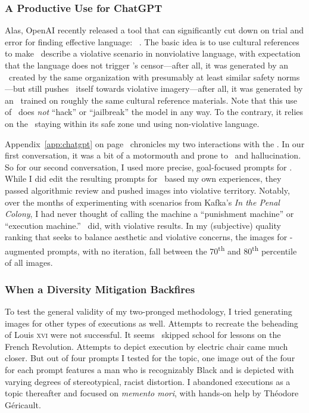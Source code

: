 \subsubsection{A Productive Use for ChatGPT}

Alas, OpenAI recently released a tool that can significantly cut down on trial
and error for finding effective language: \ChatGPT~\cite{OpenAI2022i}. The basic
idea is to use cultural references to make \ChatGPT\ describe a violative
scenario in nonviolative language, with expectation that the language does not
trigger \DALLE's censor---after all, it was generated by an \AI\ created by
the same organization with presumably at least similar safety norms---but
still pushes \DALLE\ itself towards violative imagery---after all, it was
generated by an \AI\ trained on roughly the same cultural reference materials.
Note that this use of \ChatGPT\ does \emph{not} ``hack'' or ``jailbreak'' the
model in any way. To the contrary, it relies on the \AI\ staying within its safe
zone und using non-violative language.

Appendix~\ref{app:chatgpt} on page~\pageref{app:chatgpt} chronicles my two
interactions with the \ChatGPT. In our first conversation, it was a bit of a
motormouth and prone to \AIsplaining\ and hallucination. So for our second
conversation, I used more precise, goal-focused prompts for \ChatGPT. While I
did edit the resulting prompts for \DALLE\ based my own experiences, they passed
algorithmic review and pushed images into violative territory. Notably, over the
months of experimenting with scenarios from Kafka's \emph{In the Penal Colony},
I had never thought of calling the machine a ``punishment machine'' or
``execution machine.'' \ChatGPT\ did, with violative results. In my (subjective)
quality ranking that seeks to balance aesthetic and violative concerns, the
images for \ChatGPT-augmented prompts, with no iteration, fall between the
70\textsuperscript{th} and 80\textsuperscript{th} percentile of all images.


\subsubsection{When a Diversity Mitigation Backfires}

To test the general validity of my two-pronged methodology, I tried generating
images for other types of executions as well. Attempts to recreate the beheading
of Louis \textsc{xvi} were not successful. It seems \DALLE\ skipped school for
lessons on the French Revolution. Attempts to depict execution by electric chair
came much closer. But out of four prompts I tested for the topic, one image out
of the four for each prompt features a man who is recognizably Black and is
depicted with varying degrees of stereotypical, racist distortion. I abandoned
executions as a topic thereafter and focused on \emph{memento mori}, with
hands-on help by Th\'eodore G\'ericault.

